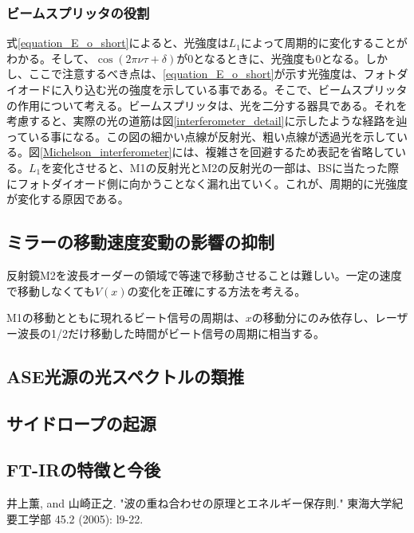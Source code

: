\documentclass[uplatex, titlepage, fontsize=10pt, paper=a4paper]{jsarticle}
\numberwithin{equation}{section}
\begin{document}
\subsubsection{ビームスプリッタの役割}
式\ref{equation_E_o_short}によると、光強度は$L_{1}$によって周期的に変化することがわかる。そして、$\cos(2\pi\nu\tau+\delta)$が0となるときに、光強度も0となる。しかし、ここで注意するべき点は、\ref{equation_E_o_short}が示す光強度は、フォトダイオードに入り込む光の強度を示している事である。そこで、ビームスプリッタの作用について考える。ビームスプリッタは、光を二分する器具である。それを考慮すると、実際の光の道筋は図\ref{interferometer_detail}に示したような経路を辿っている事になる。この図の細かい点線が反射光、粗い点線が透過光を示している。図\ref{Michelson_interferometer}には、複雑さを回避するため表記を省略している。$L_{1}$を変化させると、M1の反射光とM2の反射光の一部は、BSに当たった際にフォトダイオード側に向かうことなく漏れ出ていく。これが、周期的に光強度が変化する原因である。\cite{wave_and_energy_conservation_law}

\subsection{ミラーの移動速度変動の影響の抑制}
反射鏡M2を波長オーダーの領域で等速で移動させることは難しい。一定の速度で移動しなくても$V(x)$の変化を正確にする方法を考える。

M1の移動とともに現れるビート信号の周期は、$x$の移動分にのみ依存し、レーザー波長の1/2だけ移動した時間がビート信号の周期に相当する。

\subsection{ASE光源の光スペクトルの類推}

\subsection{サイドロープの起源}

\subsection{FT-IRの特徴と今後}

\begin{thebibliography}{99}
    井上薫, and 山崎正之. "波の重ね合わせの原理とエネルギー保存則." 東海大学紀要工学部 45.2 (2005): l9-22.
\end{thebibliography}
\end{document}
